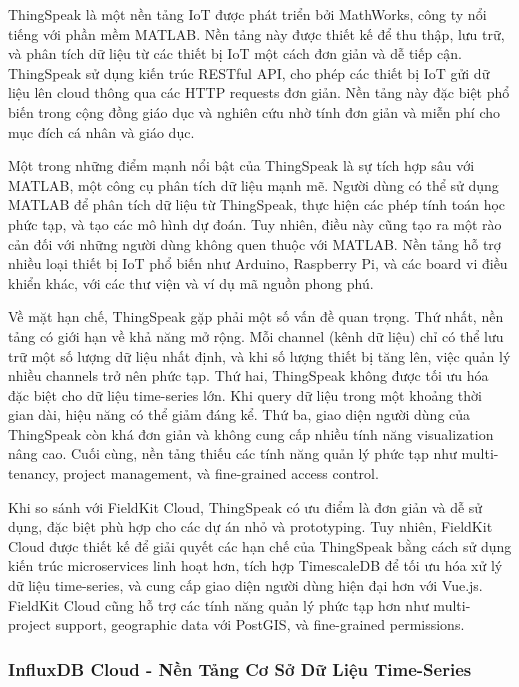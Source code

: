 ThingSpeak là một nền tảng IoT được phát triển bởi MathWorks, công ty nổi tiếng với phần mềm MATLAB. Nền tảng này được thiết kế để thu thập, lưu trữ, và phân tích dữ liệu từ các thiết bị IoT một cách đơn giản và dễ tiếp cận. ThingSpeak sử dụng kiến trúc RESTful API, cho phép các thiết bị IoT gửi dữ liệu lên cloud thông qua các HTTP requests đơn giản. Nền tảng này đặc biệt phổ biến trong cộng đồng giáo dục và nghiên cứu nhờ tính đơn giản và miễn phí cho mục đích cá nhân và giáo dục.

Một trong những điểm mạnh nổi bật của ThingSpeak là sự tích hợp sâu với MATLAB, một công cụ phân tích dữ liệu mạnh mẽ. Người dùng có thể sử dụng MATLAB để phân tích dữ liệu từ ThingSpeak, thực hiện các phép tính toán học phức tạp, và tạo các mô hình dự đoán. Tuy nhiên, điều này cũng tạo ra một rào cản đối với những người dùng không quen thuộc với MATLAB. Nền tảng hỗ trợ nhiều loại thiết bị IoT phổ biến như Arduino, Raspberry Pi, và các board vi điều khiển khác, với các thư viện và ví dụ mã nguồn phong phú.

Về mặt hạn chế, ThingSpeak gặp phải một số vấn đề quan trọng. Thứ nhất, nền tảng có giới hạn về khả năng mở rộng. Mỗi channel (kênh dữ liệu) chỉ có thể lưu trữ một số lượng dữ liệu nhất định, và khi số lượng thiết bị tăng lên, việc quản lý nhiều channels trở nên phức tạp. Thứ hai, ThingSpeak không được tối ưu hóa đặc biệt cho dữ liệu time-series lớn. Khi query dữ liệu trong một khoảng thời gian dài, hiệu năng có thể giảm đáng kể. Thứ ba, giao diện người dùng của ThingSpeak còn khá đơn giản và không cung cấp nhiều tính năng visualization nâng cao. Cuối cùng, nền tảng thiếu các tính năng quản lý phức tạp như multi-tenancy, project management, và fine-grained access control.

Khi so sánh với FieldKit Cloud, ThingSpeak có ưu điểm là đơn giản và dễ sử dụng, đặc biệt phù hợp cho các dự án nhỏ và prototyping. Tuy nhiên, FieldKit Cloud được thiết kế để giải quyết các hạn chế của ThingSpeak bằng cách sử dụng kiến trúc microservices linh hoạt hơn, tích hợp TimescaleDB để tối ưu hóa xử lý dữ liệu time-series, và cung cấp giao diện người dùng hiện đại hơn với Vue.js. FieldKit Cloud cũng hỗ trợ các tính năng quản lý phức tạp hơn như multi-project support, geographic data với PostGIS, và fine-grained permissions.

\subsubsection{InfluxDB Cloud - Nền Tảng Cơ Sở Dữ Liệu Time-Series}

